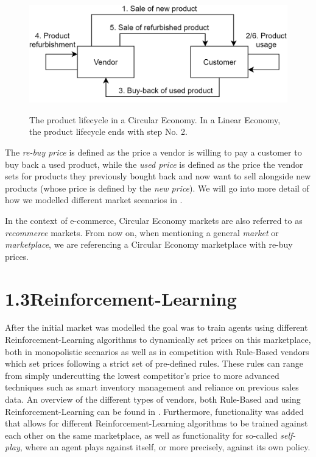 \begin{figure}[t]
	\centering
	\includegraphics[width = \textwidth]{images/product_lifecycle.png}\\
	\caption{The product lifecycle in a Circular Economy. In a Linear Economy, the product lifecycle ends with step No. 2.}\label{fig:IntroMarketDynamics}
\end{figure}

The \emph{re-buy price} is defined as the price a vendor is willing to pay a customer to buy back a used product, while the \emph{used price} is defined as the price the vendor sets for products they previously bought back and now want to sell alongside new products (whose price is defined by the \emph{new price}). We will go into more detail of how we modelled different market scenarios in .

In the context of e-commerce, Circular Economy markets are also referred to as \emph{recommerce} markets. From now on, when mentioning a general \emph{market} or \emph{marketplace}, we are referencing a Circular Economy marketplace with re-buy prices.

\section*{1.3\space\space Reinforcement-Learning}\label{sec:ReinforcementLearningIntroduction}

After the initial market was modelled the goal was to train agents using different Reinforcement-Learning algorithms to dynamically set prices on this marketplace, both in monopolistic scenarios as well as in competition with Rule-Based vendors which set prices following a strict set of pre-defined rules. These rules can range from simply undercutting the lowest competitor's price to more advanced techniques such as smart inventory management and reliance on previous sales data. An overview of the different types of vendors, both Rule-Based and using Reinforcement-Learning can be found in . Furthermore, functionality was added that allows for different Reinforcement-Learning algorithms to be trained against each other on the same marketplace, as well as functionality for so-called \emph{self-play}, where an agent plays against itself, or more precisely, against its own policy.

